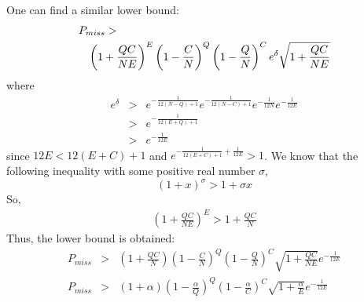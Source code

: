 \documentclass[9.5pt,journal,final,finalsubmission,twocolumn]{IEEEtran}
\begin{document}
One can find a similar lower bound:
\begin{eqnarray*}
\lefteqn{P_{miss} >}\\
& & \left(1+\frac{QC}{NE}\right)^{E} \left(1-\frac{C}{N}\right)^{Q} \left(1-\frac{Q}{N}\right)^{C} e^{\delta} \sqrt{1+\frac{QC}{NE}}\\
\end{eqnarray*}
where
\begin{eqnarray}
e^{\delta} &>& e^{-\frac{1}{12(N-Q)+1}} e^{-\frac{1}{12(N-C)+1}} e^{-\frac{1}{12N}} e^{-\frac{1}{12E}}\\
           &>& e^{-\frac{1}{12(E+Q)+1}}\\
           &>& e^{-\frac{1}{12E}}
\end{eqnarray}
since $12E<12(E+C)+1$ and $e^{-\frac{1}{12(E+C)+1}+\frac{1}{12E}}>1$.
We know that the following inequality with some positive real number $\sigma$,
\begin{equation}
(1+x)^\sigma > 1+\sigma x
\end{equation}
So,
\begin{eqnarray}
\left(1+\frac{QC}{NE}\right)^E > 1+\frac{QC}{N}
\end{eqnarray}
Thus, the lower bound is obtained:
\begin{eqnarray}
P_{miss} &>& \left(1+\frac{QC}{N}\right)\left(1-\frac{C}{N}\right)^Q\left(1-\frac{Q}{N}\right)^C \sqrt{1+\frac{QC}{NE}} e^{-\frac{1}{12E}}\\
P_{miss}         &>& (1+\alpha)\left(1-\frac{\alpha}{Q}\right)^Q \left(1-\frac{\alpha}{C}\right)^C \sqrt{1+\frac{\alpha}{E}} e^{-\frac{1}{12E}}
\end{eqnarray}
\end{document}
